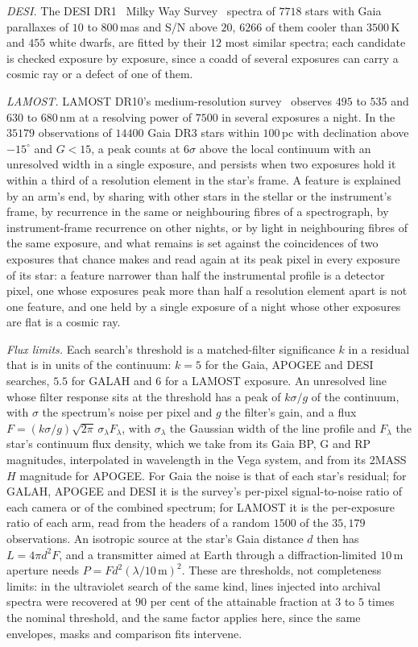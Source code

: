 \documentclass[3p,11pt]{elsarticle}
\begin{document}
\emph{DESI.} The DESI DR1~\cite{DESI2025} Milky Way Survey~\cite{Cooper2023} spectra of
$7718$ stars with Gaia parallaxes of $10$ to $800$\,mas and S/N above $20$, $6266$ of
them cooler than $3500$\,K and $455$ white dwarfs, are fitted by their $12$ most similar
spectra; each candidate is checked exposure by exposure, since a coadd of several
exposures can carry a cosmic ray or a defect of one of them.

\emph{LAMOST.} LAMOST DR10's medium-resolution survey~\cite{Cui2012,Liu2020} observes
$495$ to $535$ and $630$ to $680$\,nm at a resolving power of $7500$ in several
exposures a night. In the $35179$ observations of $14400$ Gaia DR3 stars within
$100$\,pc with declination above $-15^\circ$ and $G<15$, a peak counts at $6\sigma$
above the local continuum with an unresolved width in a single exposure, and persists
when two exposures hold it within a third of a resolution element in the star's frame.
A feature is explained by an arm's end, by sharing with other stars in the stellar or
the instrument's frame, by recurrence in the same or neighbouring fibres of a
spectrograph, by instrument-frame recurrence on other nights, or by light in
neighbouring fibres of the same exposure, and what remains is set against the
coincidences of two exposures that chance makes and read again at its peak pixel in
every exposure of its star: a feature narrower than half the instrumental profile is a
detector pixel, one whose exposures peak more than half a resolution element apart is
not one feature, and one held by a single exposure of a night whose other exposures are
flat is a cosmic ray.

\emph{Flux limits.} Each search's threshold is a matched-filter significance $k$ in a
residual that is in units of the continuum: $k=5$ for the Gaia, APOGEE and DESI
searches, $5.5$ for GALAH and $6$ for a LAMOST exposure. An unresolved line whose
filter response sits at the threshold has a peak of $k\sigma/g$ of the continuum, with
$\sigma$ the spectrum's noise per pixel and $g$ the filter's gain, and a flux
$F=(k\sigma/g)\sqrt{2\pi}\,\sigma_\lambda F_\lambda$, with $\sigma_\lambda$ the
Gaussian width of the line profile and $F_\lambda$ the star's continuum flux density,
which we take from its Gaia BP, G and RP magnitudes, interpolated in wavelength in the
Vega system, and from its 2MASS $H$ magnitude for APOGEE. For Gaia the noise is that of
each star's residual; for GALAH, APOGEE and DESI it is the survey's per-pixel
signal-to-noise ratio of each camera or of the combined spectrum; for LAMOST it is the
per-exposure ratio of each arm, read from the headers of a random $1500$ of the
$35{,}179$ observations. An isotropic source at the star's Gaia distance $d$ then has
$L=4\pi d^2F$, and a transmitter aimed at Earth through a diffraction-limited $10$\,m
aperture needs $P=F d^2(\lambda/10\,\mathrm{m})^2$. These are thresholds, not
completeness limits: in the ultraviolet search of the same kind, lines injected into
archival spectra were recovered at $90$ per cent of the attainable fraction at $3$ to
$5$ times the nominal threshold, and the same factor applies here, since the same
envelopes, masks and comparison fits intervene.
\end{document}
